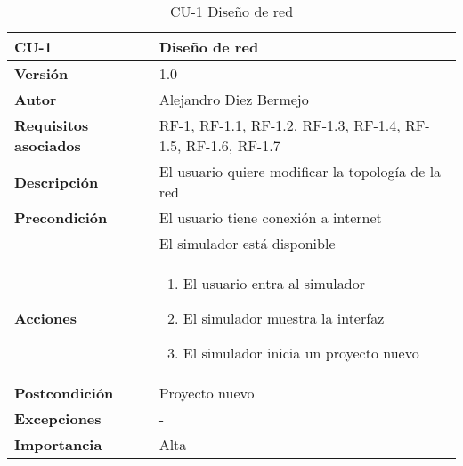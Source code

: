 \begin{table}[p]
	\centering
	\begin{tabularx}{\linewidth}{ p{} p{} }
		\toprule
		\textbf{CU-1}    & \textbf{Diseño de red}\\
		\toprule
		\textbf{Versión}              & 1.0    \\
		\textbf{Autor}                & Alejandro Diez Bermejo \\
		\textbf{Requisitos asociados} & RF-1, RF-1.1, RF-1.2, RF-1.3, RF-1.4, RF-1.5, RF-1.6, RF-1.7 \\
		\textbf{Descripción}          & El usuario quiere modificar la topología de la red \\
		\textbf{Precondición}         & El usuario tiene conexión a internet \\
                                      & El simulador está disponible \\
		\textbf{Acciones}             &
		\begin{enumerate}\def\labelenumi{\arabic{enumi}.}\tightlist
			\item El usuario entra al simulador
			\item El simulador muestra la interfaz
            \item El simulador inicia un proyecto nuevo
		\end{enumerate}\\
		\textbf{Postcondición}        & Proyecto nuevo \\
		\textbf{Excepciones}          & - \\
		\textbf{Importancia}          & Alta \\
		\bottomrule
	\end{tabularx}
	\caption{CU-1 Diseño de red}
\end{table}

